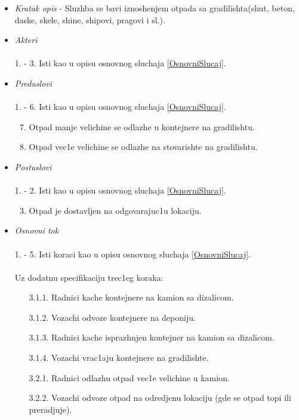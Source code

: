 \documentclass[10 pt]{article}
\begin{document}
		\begin{itemize}
			
			\item\textit{Kratak opis} - Sluzhba se bavi iznoshenjem otpada sa gradilishta(shut, beton, daske, skele, shine, shipovi, pragovi i sl.).
			
			\item\textit{Akteri} \\\\ 
			1. - 3. Isti kao u opisu osnovnog sluchaja \ref{OsnovniSlucaj}. 
			
			\item\textit{Preduslovi}\\\\ 
			1. - 6. Isti kao u opisu osnovnog sluchaja \ref{OsnovniSlucaj}.
				\begin{enumerate}
					\setcounter{enumi}{6}
					\item Otpad manje velichine se odlazhe u kontejnere na gradilishtu.
					\item Otpad vec1e velichine se odlazhe na stovarishte na gradilishtu.
				\end{enumerate} 
			
			\item\textit{Postuslovi}\\\\
				1. - 2. Isti kao u opisu osnovnog sluchaja \ref{OsnovniSlucaj}.
				\begin{enumerate}
					\setcounter{enumi}{2}
					\item Otpad je dostavljen na odgovarajuc1u lokaciju.
				\end{enumerate}
			
			\item\textit{Osnovni tok}\\\\
			1. - 5. Isti koraci kao u opisu osnovnog sluchaja \ref{OsnovniSlucaj}.\\\\
			Uz dodatnu specifikaciju trec1eg koraka:
			\begin{enumerate}
				\item [3.1.1.] Radnici kache kontejnere na kamion sa dizalicom.
				\item [3.1.2.] Vozachi odvoze kontejnere na deponiju.
				\item [3.1.3.] Radnici kache isprazhnjen kontejner na kamion sa dizalicom.
				\item [3.1.4.] Vozachi vrac1aju kontejnere na gradilishte.
				
				\item [3.2.1.] Radnici odlazhu otpad vec1e velichine u kamion.
				\item [3.2.2.] Vozachi odvoze otpad na odredjenu lokaciju (gde se otpad topi ili preradjuje).
			\end{enumerate}
		
		\end{itemize}
	
\end{document}
